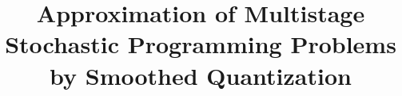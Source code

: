 \documentclass{article}              %
\def\EMAIL#1{\href{mailto:#1}{#1}}%
\begin{document}




\title{Approximation of Multistage Stochastic Programming Problems by Smoothed Quantization}




%

\end{document}
